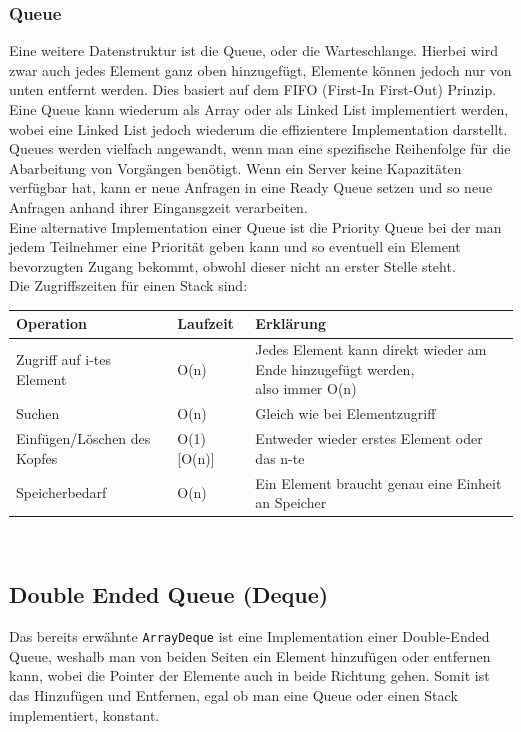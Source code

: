 \documentclass{article}
\begin{document}
	\subsubsection{Queue}
	Eine weitere Datenstruktur ist die Queue, oder die Warteschlange. Hierbei wird zwar auch jedes Element ganz oben hinzugefügt, Elemente können jedoch nur von unten entfernt werden. Dies basiert auf dem FIFO (First-In First-Out) Prinzip. Eine Queue kann wiederum als Array oder als Linked List implementiert werden, wobei eine Linked List jedoch wiederum die effizientere Implementation darstellt. \\
	Queues werden vielfach angewandt, wenn man eine spezifische Reihenfolge für die Abarbeitung von Vorgängen benötigt. Wenn ein Server keine Kapazitäten verfügbar hat, kann er neue Anfragen in eine Ready Queue setzen und so neue Anfragen anhand ihrer Eingansgzeit verarbeiten. \\
	Eine alternative Implementation einer Queue ist die Priority Queue bei der man jedem Teilnehmer eine Priorität geben kann und so eventuell ein Element bevorzugten Zugang bekommt, obwohl dieser nicht an erster Stelle steht. \\
	Die Zugriffszeiten für einen Stack sind: \\
	\begin{tabular}{| l | l | l |}
		\toprule
		Operation & Laufzeit & Erklärung \\ \midrule
		Zugriff auf i-tes Element & O(n) & \makecell[l]{Jedes Element kann direkt wieder am Ende hinzugefügt werden, \\ also immer O(n)} \\ \hline
		Suchen & O(n) & Gleich wie bei Elementzugriff \\ \hline
		Einfügen/Löschen des Kopfes & O(1) [O(n)] & Entweder wieder erstes Element oder das n-te \\ \hline
		Speicherbedarf & O(n) & Ein Element braucht genau eine Einheit an Speicher \\
		\bottomrule
	\end{tabular} \\

	\subsection{Double Ended Queue (Deque)}
	Das bereits erwähnte \texttt{ArrayDeque} ist eine Implementation einer Double-Ended Queue, weshalb man von beiden Seiten ein Element hinzufügen oder entfernen kann, wobei die Pointer der Elemente auch in beide Richtung gehen. Somit ist das Hinzufügen und Entfernen, egal ob man eine Queue oder einen Stack implementiert, konstant.
	\newpage
\end{document}

